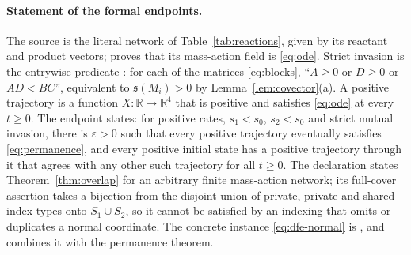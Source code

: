 \documentclass[11pt,a4paper]{article}
\theoremstyle{plain}
\theoremstyle{definition}
\theoremstyle{remark}
\newcommand{\R}{\mathbb R}
\newcommand{\spb}{\mathfrak s}
\newcommand{\eps}{\varepsilon}
\begin{document}
\paragraph{Statement of the formal endpoints.}
The source is the literal network of Table~\ref{tab:reactions}, given by its reactant and product vectors;  proves that its mass-action field is \eqref{eq:ode}. Strict invasion is the entrywise predicate : for each of the matrices \eqref{eq:blocks}, ``$A\ge0$ or $D\ge0$ or $AD<BC$'', equivalent to $\spb(M_i)>0$ by Lemma~\ref{lem:covector}(a). A positive trajectory is a function $X:\R\to\R^4$ that is positive and satisfies \eqref{eq:ode} at every $t\ge0$. The endpoint  states: for positive rates, $s_1<s_0$, $s_2<s_0$ and strict mutual invasion, there is $\eps>0$ such that every positive trajectory eventually satisfies \eqref{eq:permanence}, and every positive initial state has a positive trajectory through it that agrees with any other such trajectory for all $t\ge0$. The declaration  states Theorem~\ref{thm:overlap} for an arbitrary finite mass-action network; its full-cover assertion takes a bijection from the disjoint union of private, private and shared index types onto $S_1\cup S_2$, so it cannot be satisfied by an indexing that omits or duplicates a normal coordinate. The concrete instance \eqref{eq:dfe-normal} is , and  combines it with the permanence theorem.
\end{document}
